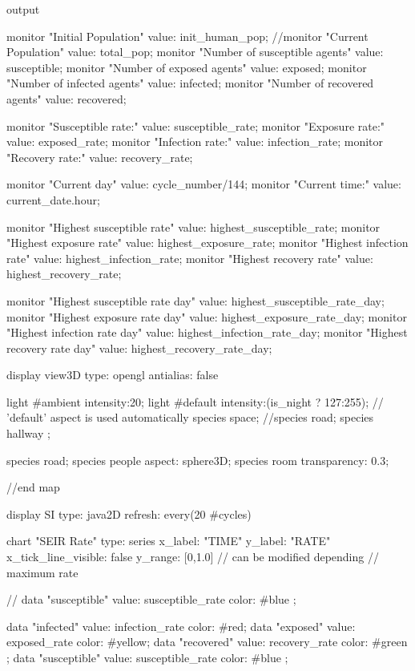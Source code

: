 \begin{verbatimtab}[4]
{    output {
    	monitor "Initial Population" value: init_human_pop;
    	//monitor "Current Population" value: total_pop;
    	monitor "Number of susceptible agents" value: susceptible;
    	monitor "Number of exposed agents" value: exposed;
    	monitor "Number of infected agents" value: infected;
    	monitor "Number of recovered agents" value: recovered;
    	
    	monitor "Susceptible rate:" value: susceptible_rate;
    	monitor "Exposure rate:" value: exposed_rate;
    	monitor "Infection rate:" value: infection_rate;
    	monitor "Recovery rate:" value: recovery_rate;
    	
    	monitor "Current day" value: cycle_number/144;
    	monitor "Current time:" value: current_date.hour;
    	
    	monitor "Highest susceptible rate" value: highest_susceptible_rate;
    	monitor "Highest exposure rate" value: highest_exposure_rate;
    	monitor "Highest infection rate" value: highest_infection_rate;
    	monitor "Highest recovery rate" value: highest_recovery_rate;
    	
    	
    	monitor "Highest susceptible rate day" value: highest_susceptible_rate_day;
    	monitor "Highest exposure rate day" value: highest_exposure_rate_day;
    	monitor "Highest infection rate day" value: highest_infection_rate_day;
    	monitor "Highest recovery rate day" value: highest_recovery_rate_day;
    	
        display view3D type: opengl antialias: false {
        	light #ambient intensity:20;
        	light #default intensity:(is_night ? 127:255);
        	// 'default' aspect is used automatically  
        	species space;
        	//species road;
        	species hallway ;
        	
             
            species road;
            species people aspect: sphere3D; 
            species room transparency: 0.3;
                     
        }//end map
        
        display SI type: java2D refresh: every(20  #cycles) {
			chart "SEIR Rate" type: series 
			x_label: "TIME"
			y_label: "RATE"
			x_tick_line_visible: false
			y_range: [0,1.0] // can be modified depending
							 // maximum rate
			{
				// data "susceptible" value: susceptible_rate color: #blue ;
				
				data "infected" value: infection_rate color: #red;
				data "exposed" value: exposed_rate color: #yellow;
				data "recovered" value: recovery_rate color: #green ;
				data "susceptible" value: susceptible_rate color: #blue ;
				
			}
		}
    }
 
}


\end{verbatimtab}
\normalsize